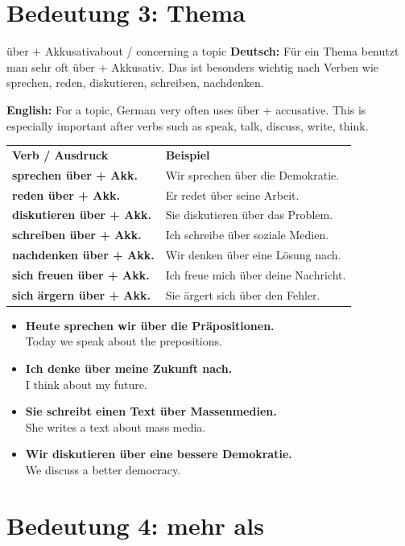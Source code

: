 \documentclass[a4paper,11pt]{article}
\newcommand{\GermanText}[1]{\textbf{Deutsch: }#1\par}
\newcommand{\EnglishText}[1]{{\small\color{SoftGray}\textbf{English: }#1\par}}
\newcommand{\ExampleItem}[2]{\item \textbf{#1}\\{\small\color{SoftGray}#2}}
\begin{document}
\section{Bedeutung 3: Thema}

\begin{grammarentry}{über + Akkusativ}{about / concerning a topic}
\GermanText{Für ein Thema benutzt man sehr oft \glqq über + Akkusativ\grqq. Das ist besonders wichtig nach Verben wie sprechen, reden, diskutieren, schreiben, nachdenken.}
\EnglishText{For a topic, German very often uses \glqq über + accusative\grqq. This is especially important after verbs such as speak, talk, discuss, write, think.}
\end{grammarentry}

\begin{tabularx}{\textwidth}{>{\bfseries}p{}X}
\rowcolor{HeaderBlueDark}
\color{white}\textbf{Verb / Ausdruck} & \color{white}\textbf{Beispiel} \\
sprechen über + Akk. & Wir sprechen über die Demokratie. \\
reden über + Akk. & Er redet über seine Arbeit. \\
diskutieren über + Akk. & Sie diskutieren über das Problem. \\
schreiben über + Akk. & Ich schreibe über soziale Medien. \\
nachdenken über + Akk. & Wir denken über eine Lösung nach. \\
sich freuen über + Akk. & Ich freue mich über deine Nachricht. \\
sich ärgern über + Akk. & Sie ärgert sich über den Fehler. \\
\end{tabularx}

\begin{exbox}
\begin{itemize}
    \ExampleItem{Heute sprechen wir über die Präpositionen.}{Today we speak about the prepositions.}
    \ExampleItem{Ich denke über meine Zukunft nach.}{I think about my future.}
    \ExampleItem{Sie schreibt einen Text über Massenmedien.}{She writes a text about mass media.}
    \ExampleItem{Wir diskutieren über eine bessere Demokratie.}{We discuss a better democracy.}
\end{itemize}
\end{exbox}

\section{Bedeutung 4: mehr als}
\end{document}
